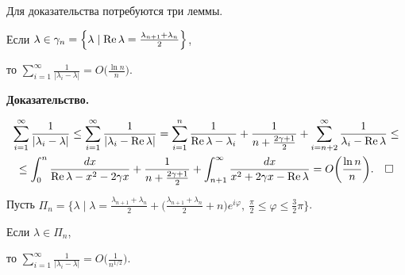 Для доказательства потребуются три леммы.





\begin{lem} Если $\lambda\in\gamma_n=\left\{\lambda\mid\re\lambda=


\frac{\lambda_{n+1}+\lambda_n}2\right\}$,


то $\sum\limits_{i=1}^\infty\frac1{|\lambda_i-\lambda|}=


O\big(\frac{\ln n}n\big)$.


\end{lem}





{\bf Доказательство.}


\begin{multline*}


\sum_{i=1}^\infty \frac1{|\lambda_i-\lambda|}\le


\sum_{i=1}^\infty\frac1{|\lambda_i-\re\lambda|}=


\sum_{i=1}^n\frac1{\re\lambda-\lambda_i}+\frac1{n+\frac{2\gamma+1}2} +


\sum_{i=n+2}^\infty\frac1{\lambda_i-\re\lambda}\le \\


%


\le\int_0^n\frac{dx}{\re\lambda-x^2-2\gamma x}+


\frac1{n+\frac{2\gamma+1}2} +


\int_{n+1}^\infty\frac{dx}{x^2+2\gamma x-\re\lambda}=


O\bigg(\frac{\ln n}n\bigg).\quad\square


\end{multline*}





Пусть $\Pi_n=\big\{\lambda\mid\lambda=


\frac{\lambda_{n+1}+\lambda_n}2+


\big(\frac{\lambda_{n+1}+\lambda_n}2+n\big)e^{i\varphi},


\ \frac\pi2\le\varphi\le\frac32\pi\big\}$.





\begin{lem} Если $\lambda\in\Pi_n$,


то $\sum\limits_{i=1}^\infty\frac1{|\lambda_i-\lambda|}


= O\big(\frac1{n^{1/2}}\big)$.


\end{lem}





